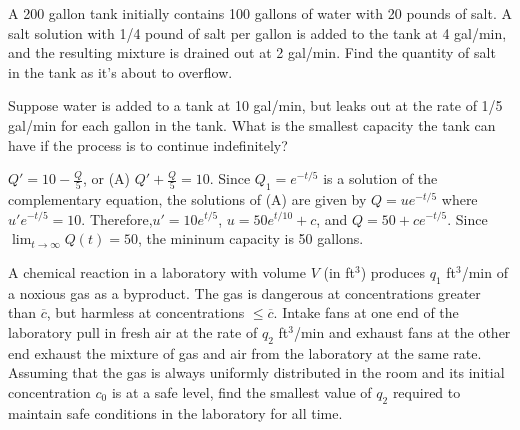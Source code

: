 \documentclass{ximera}
\begin{document}
\begin{problem}\label{exer:4.2.11}
A 200 gallon tank initially contains 100 gallons of water
with 20 pounds of salt.  A salt solution with 1/4 pound of
salt per gallon is added to the tank at 4 gal/min, and the
resulting  mixture is drained out at 2 gal/min.
Find the quantity of salt in the tank as it's about to
overflow.
\end{problem}

\begin{problem}\label{exer:4.2.12}
Suppose  water is added to a tank at 10 gal/min, but leaks
out at the rate of 1/5 gal/min for each gallon in the tank.
What is the smallest capacity the tank can have if the
process is to continue indefinitely?

\begin{solution}
$Q'=10-\frac{Q}{5}$, or
 (A) $Q'+\frac{Q}{5}=10$. Since $Q_1=e^{-t/5}$ is a solution
of the complementary equation, the solutions of (A) are given by
$Q=ue^{-t/5}$ where $u'e^{-t/5}=10$. Therefore,$u'=10e^{t/5}$,
$u=50e^{t/10}+c$, and $Q=50+ce^{-t/5}$. Since
$\lim_{t\to\infty}Q(t)=50$, the mininum capacity is 50 gallons.
\end{solution}
\end{problem}

\begin{problem}\label{exer:4.2.13}
A chemical reaction in a laboratory with volume $V$ (in ft$^3$)
produces $q_1$ ft$^3$/min of a noxious gas as a byproduct. The gas is
dangerous at concentrations greater than $\overline c$,
 but harmless at
concentrations $\le \overline c$. Intake fans at one end of the
laboratory pull in fresh air at the rate of $q_2$ ft$^3$/min and
exhaust fans at the other end exhaust the mixture of gas and air from
the
laboratory at the same rate. Assuming that the gas is always uniformly
distributed in the room and its initial concentration $c_0$ is at a
safe level, find the smallest value of $q_2$ required to maintain safe
conditions in the laboratory for all time.
\end{problem}
\end{document}
